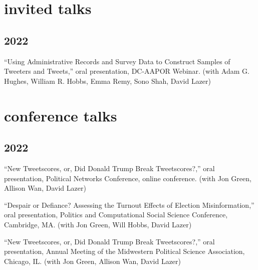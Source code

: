 \documentclass[11pt, letter]{article}
\begin{document}
\section{invited talks}
\subsection{2022}
\begin{hangparas}{.25in}{1}
  ``Using Administrative Records and Survey Data to Construct Samples
  of Tweeters and Tweets,'' oral presentation, DC-AAPOR Webinar. (with
  Adam G. Hughes, William R. Hobbs, Emma Remy, Sono Shah, David Lazer)
  \vspace{2mm}

\end{hangparas}

\vspace{2mm}
\section{conference talks}

\subsection{2022}
\begin{hangparas}{.25in}{1}
``New Tweetscores, or, Did Donald Trump Break Tweetscores?,'' oral
presentation, Political Networks Conference, online
conference. (with Jon Green, Allison Wan, David Lazer) \vspace{2mm}

``Despair or Defiance? Assessing the Turnout Effects of Election
Misinformation,'' oral presentation, Politics and Computational Social
Science Conference, Cambridge, MA. (with Jon Green, Will Hobbs, David
Lazer) \vspace{2mm}

``New Tweetscores, or, Did Donald Trump Break Tweetscores?,'' oral
presentation, Annual Meeting of the Midwestern Political Science Association,
Chicago, IL. (with Jon Green, Allison Wan, David Lazer) \vspace{2mm}
\end{hangparas}
\end{document}
